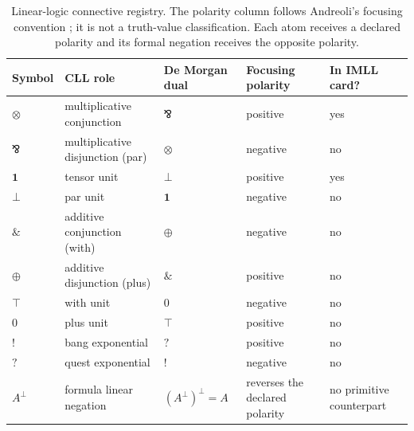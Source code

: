 \begin{table}[!htbp]
\centering
\begingroup\small
\setlength{\tabcolsep}{3pt}
\begin{tabular}{@{}p{}p{}p{}
  p{}p{}@{}}
\toprule
Symbol & CLL role & De Morgan dual & Focusing polarity & In IMLL card? \\
\midrule
\(\otimes\) & multiplicative conjunction & \(\bindnasrepma\) & positive & yes \\
\(\bindnasrepma\) & multiplicative disjunction (par) & \(\otimes\) & negative & no \\
\(\mathbf 1\) & tensor unit & \(\bot\) & positive & yes \\
\(\bot\) & par unit & \(\mathbf 1\) & negative & no \\
\(\mathbin{\&}\) & additive conjunction (with) & \(\oplus\) & negative & no \\
\(\oplus\) & additive disjunction (plus) & \(\mathbin{\&}\) & positive & no \\
\(\top\) & with unit & \(0\) & negative & no \\
\(0\) & plus unit & \(\top\) & positive & no \\
\(!\) & bang exponential & \(?\) & positive & no \\
\(?\) & quest exponential & \(!\) & negative & no \\
\(A^\perp\) & formula linear negation & \((A^\perp)^\perp=A\) & reverses
the declared polarity & no primitive counterpart \\
\bottomrule
\end{tabular}
\endgroup
\caption{Linear-logic connective registry.  The polarity
column follows Andreoli's focusing convention \cite{Andreoli1992}; it is not
a truth-value classification.  Each atom receives a declared polarity and its
formal negation receives the opposite polarity.}
\label{tab:p08-linear-connectives}
\end{table}

